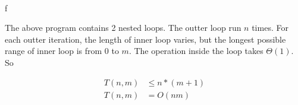 \documentclass{article}
\begin{document}
\paragraph{}

f

The above program contains 2 nested loops. The outter loop run $n$ times. For each outter iteration, the length of inner loop varies, but the longest possible range of inner loop is from $0$ to $m$. The operation inside the loop takes $\Theta(1)$. So

$$\begin{aligned}
    T(n, m) &\le n * (m + 1)\\
    T(n, m) &= O(nm)
\end{aligned}$$
\end{document}
